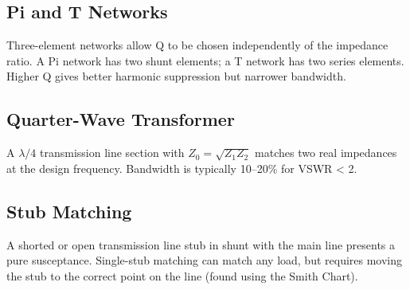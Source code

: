				

\subsection{Pi and T Networks}

				

Three-element networks allow Q to be chosen independently of the impedance ratio. A Pi network has two shunt elements; a T network has two series elements. Higher Q gives better harmonic suppression but narrower bandwidth.

				

\subsection{Quarter-Wave Transformer}

				

A $\lambda/4$ transmission line section with $Z_0 = \sqrt{Z_1 Z_2}$ matches two real impedances at the design frequency. Bandwidth is typically 10–20\% for VSWR \textless{} 2.

				

\subsection{Stub Matching}

				

A shorted or open transmission line stub in shunt with the main line presents a pure susceptance. Single-stub matching can match any load, but requires moving the stub to the correct point on the line (found using the Smith Chart).



